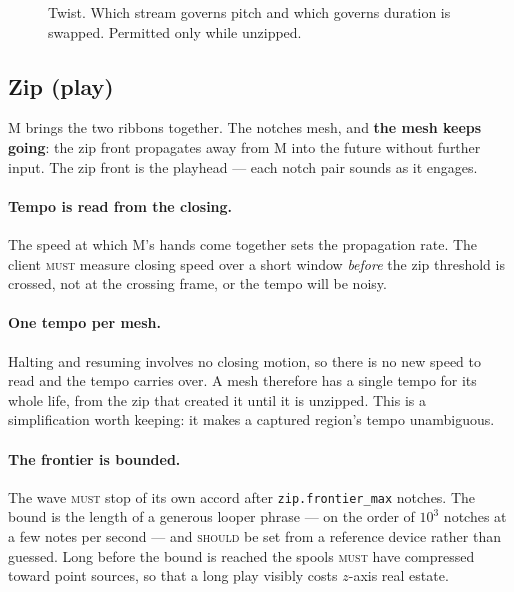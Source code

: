 \documentclass[11pt,a4paper]{article}
\newcommand{\MUST}{\textsc{must}}
\newcommand{\SHOULD}{\textsc{should}}
\theoremstyle{definition}
\theoremstyle{plain}
\theoremstyle{remark}
\newcommand{\spools}{%
  \fill[ribL,opacity=.45,rounded corners=2pt] (1.55,5.40) rectangle (2.45,5.95);
  \fill[ribR,opacity=.45,rounded corners=2pt] (5.55,5.40) rectangle (6.45,5.95);
  \node[font=\scriptsize] at (2,6.22) {left spool};
  \node[font=\scriptsize] at (6,6.22) {right spool};
}
\newcommand{\musician}{%
  \draw[gray] (4,-0.10) circle (0.23);
  \node[font=\scriptsize] at (4,-0.10) {M};
}
\newcommand{\axes}{%
  \draw[->,gray,thin] (0.85,4.30) -- (1.45,4.30) node[right,font=\scriptsize]{$x$};
  \draw[->,gray,thin] (0.85,4.30) -- (0.85,4.90) node[above,font=\scriptsize]{$z$};
}
\newcommand{\ribbonsopen}{%
  \draw[ribL,opacity=.45,line width=16pt,line join=round]
    (2,5.40) -- (2,4.60) -- (3.10,4.00) -- (3.10,0.70);
  \draw[ribR,opacity=.45,line width=16pt,line join=round]
    (6,5.40) -- (6,4.60) -- (4.90,4.00) -- (4.90,0.70);
}
\newcommand{\handat}[2]{\filldraw[fill=white,draw=gray!80,thin] (#1,#2) circle (0.17);}
\newcommand{\handsdefault}{\handat{3.10}{0.55}\handat{4.90}{0.55}}
\begin{document}
\begin{figure}[H]\centering
{}
\caption{Twist. Which stream governs pitch and which governs duration is swapped. Permitted only
while unzipped.}
\end{figure}

\subsection{Zip \normalfont(play)}
\label{sec:zip}

M brings the two ribbons together. The notches mesh, and \textbf{the mesh keeps going}: the zip
front propagates away from M into the future without further input. The zip front is the playhead
--- each notch pair sounds as it engages.

\paragraph{Tempo is read from the closing.} The speed at which M's hands come together sets the
propagation rate. The client \MUST{} measure closing speed over a short window \emph{before} the
zip threshold is crossed, not at the crossing frame, or the tempo will be noisy.

\paragraph{One tempo per mesh.} Halting and resuming involves no closing motion, so there is no new
speed to read and the tempo carries over. A mesh therefore has a single tempo for its whole life,
from the zip that created it until it is unzipped. This is a simplification worth keeping: it makes
a captured region's tempo unambiguous.

\paragraph{The frontier is bounded.} The wave \MUST{} stop of its own accord after
\texttt{zip.frontier\_max} notches. The bound is the length of a generous looper phrase --- on the
order of $10^{3}$ notches at a few notes per second --- and \SHOULD{} be set from a reference
device rather than guessed. Long before the bound is reached the spools \MUST{} have compressed
toward point sources, so that a long play visibly costs $z$-axis real estate.
\end{document}
